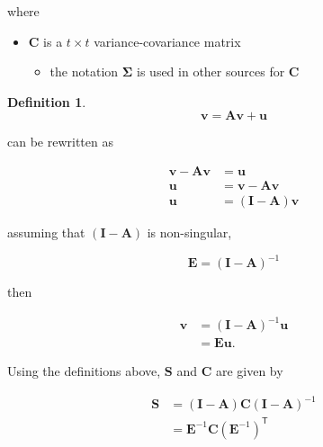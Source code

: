 \documentclass[
]{book}
\providecommand{\tightlist}{%
  \setlength{\itemsep}{0pt}\setlength{\parskip}{0pt}}
\theoremstyle{definition}
\newtheorem{definition}{Definition}[chapter]
\theoremstyle{definition}
\theoremstyle{definition}
\theoremstyle{remark}
\begin{document}
\noindent where

\begin{itemize}
\tightlist
\item
  \(\mathbf{C}\) is a \(t \times t\) variance-covariance matrix

  \begin{itemize}
  \tightlist
  \item
    the notation \(\boldsymbol{\Sigma}\) is used in other sources for \(\mathbf{C}\)
  \end{itemize}
\end{itemize}

\begin{definition}
\protect\hypertarget{def:unnamed-chunk-5}{}{\label{def:unnamed-chunk-5} }\begin{equation*}
  \mathbf{v}
  =
  \mathbf{A} \mathbf{v} + \mathbf{u}
\end{equation*}

\noindent can be rewritten as

\begin{equation}
  \begin{split}
    \mathbf{v} - \mathbf{A} \mathbf{v}
    &=
    \mathbf{u} \\
    \mathbf{u}
    &=
    \mathbf{v} - \mathbf{A} \mathbf{v} \\
    \mathbf{u}
    &=
    \left( \mathbf{I} - \mathbf{A} \right) \mathbf{v}
  \end{split}
\end{equation}

\noindent assuming that \(\left( \mathbf{I} - \mathbf{A} \right)\) is non-singular,

\begin{equation}
  \mathbf{E}
  = 
  \left( \mathbf{I} - \mathbf{A} \right)^{-1}
\end{equation}

\noindent then

\begin{equation}
  \begin{split}
    \mathbf{v}
    &=
    \left( \mathbf{I} - \mathbf{A} \right)^{-1} \mathbf{u} \\
    &=
    \mathbf{E} \mathbf{u} .
  \end{split}
\end{equation}
\end{definition}

Using the definitions above,
\(\mathbf{S}\) and \(\mathbf{C}\)
are given by

\begin{equation}
  \begin{split}
    \mathbf{S}
    &=
    \left( \mathbf{I} - \mathbf{A} \right)
    \mathbf{C}
    \left( \mathbf{I} - \mathbf{A} \right)^{-1} \\
    &=
    \mathbf{E}^{-1} \mathbf{C} \left( \mathbf{E}^{-1} \right)^{\mathsf{T}}
    \end{split}
\end{equation}
\end{document}
